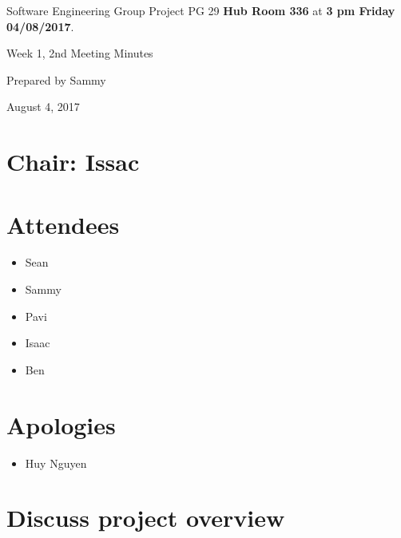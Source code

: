 \documentclass[11pt, a4paper]{article}
\begin{document}
\noindent Software Engineering Group Project PG 29 {\bf Hub Room 336} at {\bf 3 pm Friday 04/08/2017}.
\vspace*{10pt}
\begin{center}
\huge Week 1, 2nd Meeting Minutes
\end{center}
\vspace*{10pt}
\begin{center}
\huge Prepared by Sammy
\end{center}
\begin{center}
\huge August 4, 2017
\end{center}
\section*{Chair: Issac}

\section{Attendees}
\begin{itemize}
\item Sean
\item Sammy
\item Pavi
\item Isaac
\item Ben
\end{itemize}

\section{Apologies}
\begin{itemize}
\item Huy Nguyen
\end{itemize}

\section{Discuss project overview}
\end{document}
